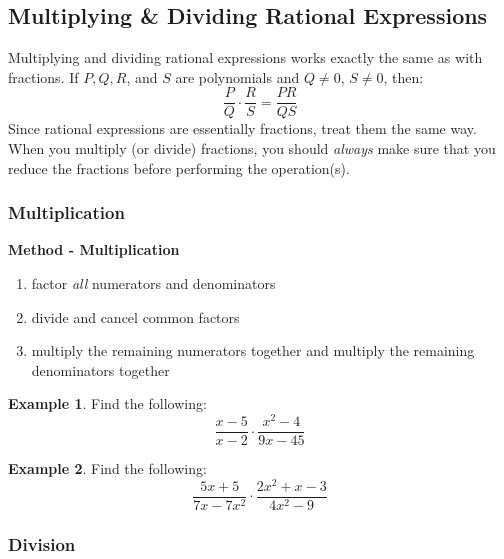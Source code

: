 \documentclass[addpoints,12pt]{exam}
\theoremstyle{definition}
\newtheorem{example}{Example}[subsection]
\begin{document}
\setcounter{section}{7}
\setcounter{subsection}{1}

\subsection{Multiplying \& Dividing Rational Expressions}

\noindent Multiplying and dividing rational expressions works exactly the same as with fractions.
\vspace{.25in}
\noindent If $P, Q, R$, and $S$ are polynomials and $Q\neq 0$, $S\neq 0$, then: \[\dfrac{P}{Q}\cdot\dfrac{R}{S} = \dfrac{PR}{QS}\]
\vspace{.25in}
Since rational expressions are essentially fractions, treat them the same way. When you multiply (or divide) fractions, you should \emph{always} make sure that you reduce the fractions before performing the operation(s).

\subsubsection*{Multiplication}

\begin{mdframed}
\textbf{Method - Multiplication}
\begin{enumerate}
\item factor \emph{all} numerators and denominators
\item divide and cancel common factors
\item multiply the remaining numerators together and multiply the remaining denominators together
\end{enumerate}
\end{mdframed}

\vspace{.25in}

\begin{example}
Find the following: \[\dfrac{x-5}{x-2}\cdot\dfrac{x^2-4}{9x-45}\]

\end{example}

\newpage

\begin{example}
Find the following: \[\dfrac{5x+5}{7x-7x^2}\cdot\dfrac{2x^2+x-3}{4x^2-9}\]
\vspace{2in}
\end{example}

\subsubsection*{Division}
\end{document}

